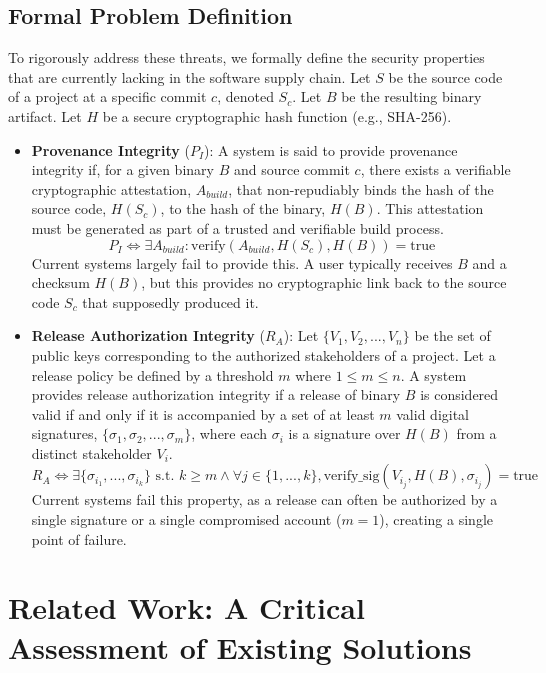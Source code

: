 \documentclass{article}
\begin{document}
\subsection{Formal Problem Definition}

To rigorously address these threats, we formally define the security properties that are currently lacking in the software supply chain. Let $S$ be the source code of a project at a specific commit $c$, denoted $S_c$. Let $B$ be the resulting binary artifact. Let $H$ be a secure cryptographic hash function (e.g., SHA-256).

\begin{itemize}
\item \textbf{Provenance Integrity} ($P_I$): A system is said to provide provenance integrity if, for a given binary $B$ and source commit $c$, there exists a verifiable cryptographic attestation, $A_{build}$, that non-repudiably binds the hash of the source code, $H(S_c)$, to the hash of the binary, $H(B)$. This attestation must be generated as part of a trusted and verifiable build process.
$$P_I \iff \exists A_{build} : \text{verify}(A_{build}, H(S_c), H(B)) = \text{true}$$
Current systems largely fail to provide this. A user typically receives $B$ and a checksum $H(B)$, but this provides no cryptographic link back to the source code $S_c$ that supposedly produced it.

\item \textbf{Release Authorization Integrity} ($R_A$): Let $\{V_1, V_2,..., V_n\}$ be the set of public keys corresponding to the authorized stakeholders of a project. Let a release policy be defined by a threshold $m$ where $1 \le m \le n$. A system provides release authorization integrity if a release of binary $B$ is considered valid if and only if it is accompanied by a set of at least $m$ valid digital signatures, $\{\sigma_1, \sigma_2,..., \sigma_m\}$, where each $\sigma_i$ is a signature over $H(B)$ from a distinct stakeholder $V_i$.
$$R_A \iff \exists \{\sigma_{i_1},..., \sigma_{i_k}\} \text{ s.t. } k \ge m \land \forall j \in \{1,..., k\}, \text{verify\_sig}(V_{i_j}, H(B), \sigma_{i_j}) = \text{true}$$
Current systems fail this property, as a release can often be authorized by a single signature or a single compromised account ($m=1$), creating a single point of failure.~\cite{aikido2025rand}
\end{itemize}

\section{Related Work: A Critical Assessment of Existing Solutions}
\label{sec:related-work-a-critical-assessment-of-existing-s}
\end{document}
